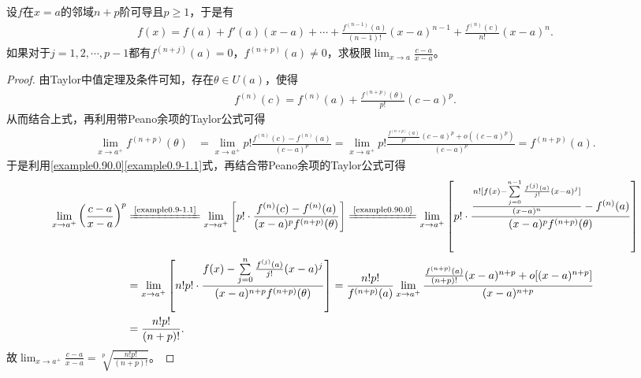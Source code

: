 \documentclass[../../main.tex]{subfiles}%
\begin{document}
\begin{example}
设$f$在$x = a$的邻域$n + p$阶可导且$p\geqslant  1$，于是有
\begin{align}
f(x) = f(a) + f'(a)(x - a) + \cdots + \frac{f^{(n - 1)}(a)}{(n - 1)!}(x - a)^{n - 1} + \frac{f^{(n)}(c)}{n!}(x - a)^n.\label{example0.90.0}
\end{align}
如果对于$j = 1,2,\cdots,p - 1$都有$f^{(n + j)}(a) = 0$，$f^{(n + p)}(a)\neq 0$，求极限$\lim_{x\to a}\frac{c - a}{x - a}$。 
\end{example}
\begin{proof}

由Taylor中值定理及条件可知，存在$\theta\in U(a)$，使得
\begin{align}
f^{(n)}(c) = f^{(n)}(a) + \frac{f^{(n + p)}(\theta)}{p!}(c - a)^p. \label{example0.9-1.1}
\end{align}
从而结合上式，再利用带Peano余项的Taylor公式可得
\begin{align*}
\lim_{x\to a^+}f^{(n + p)}(\theta) &= \lim_{x\to a^+}p!\frac{f^{(n)}(c) - f^{(n)}(a)}{(c - a)^p} = \lim_{x\to a^+}p!\frac{\frac{f^{(n + p)}(a)}{p!}(c - a)^p + o((c - a)^p)}{(c - a)^p} = f^{(n + p)}(a).
\end{align*}
于是利用\eqref{example0.90.0}\eqref{example0.9-1.1}式，再结合带Peano余项的Taylor公式可得
\begin{align*}
\lim_{x\to a^+}\left(\frac{c - a}{x - a}\right)^p &\xlongequal{\text{\eqref{example0.9-1.1}}} \lim_{x\to a^+}\left[p!\cdot\frac{f^{(n)}(c) - f^{(n)}(a)}{(x - a)^pf^{(n + p)}(\theta)}\right] \xlongequal{\text{\eqref{example0.90.0}}} \lim_{x\to a^+}\left[p!\cdot\frac{\frac{n![f(x) - \sum\limits_{j = 0}^{n - 1}\frac{f^{(j)}(a)}{j!}(x - a)^j]}{(x - a)^n} - f^{(n)}(a)}{(x - a)^pf^{(n + p)}(\theta)}\right]\\
&= \lim_{x\to a^+}\left[n!p!\cdot\frac{f(x) - \sum\limits_{j = 0}^n\frac{f^{(j)}(a)}{j!}(x - a)^j}{(x - a)^{n + p}f^{(n + p)}(\theta)}\right] = \frac{n!p!}{f^{(n + p)}(a)}\lim_{x\to a^+}\frac{\frac{f^{(n + p)}(a)}{(n + p)!}(x - a)^{n + p} + o[(x - a)^{n + p}]}{(x - a)^{n + p}} 
\\
&= \frac{n!p!}{(n + p)!}.
\end{align*}
故$\lim_{x\to a^+}\frac{c - a}{x - a} = \sqrt[p]{\frac{n!p!}{(n + p)!}}$。 

\end{proof}
\end{document}
